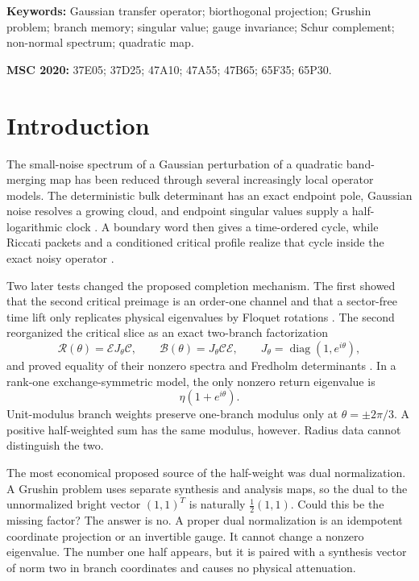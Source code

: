 \documentclass[11pt]{article}
\theoremstyle{definition}
\theoremstyle{remark}
\newcommand{\cR}{\mathcal R}
\newcommand{\cB}{\mathcal B}
\newcommand{\cC}{\mathcal C}
\newcommand{\cE}{\mathcal E}
\begin{document}
\noindent\textbf{Keywords:} Gaussian transfer operator; biorthogonal
projection; Grushin problem; branch memory; singular value; gauge
invariance; Schur complement; non-normal spectrum; quadratic map.

\medskip
\noindent\textbf{MSC 2020:} 37E05; 37D25; 47A10; 47A55; 47B65; 65F35;
65P30.

\section{Introduction}
\label{sec:introduction}

The small-noise spectrum of a Gaussian perturbation of a quadratic
band-merging map has been reduced through several increasingly local
operator models.  The deterministic bulk determinant has an exact endpoint
pole, Gaussian noise resolves a growing cloud, and endpoint singular values
supply a half-logarithmic clock
\citep{WangBulkScattering2026,WangEndpointRank2026}.  A boundary word then
gives a time-ordered cycle, while Riccati packets and a conditioned critical
profile realize that cycle inside the exact noisy operator
\citep{WangTimeOrdered2026,WangGaussianReturn2026}.

Two later tests changed the proposed completion mechanism.  The first showed
that the second critical preimage is an order-one channel and that a
sector-free time lift only replicates physical eigenvalues by Floquet
rotations \citep{WangComplement2026}.  The second reorganized the critical
slice as an exact two-branch factorization
\begin{equation}\label{eq:intro-factorization}
 \cR(\theta)=\cE J_\theta\cC,
 \qquad
 \cB(\theta)=J_\theta\cC\cE,
 \qquad
 J_\theta=\operatorname{diag}(1,e^{i\theta}),
\end{equation}
and proved equality of their nonzero spectra and Fredholm determinants
\citep{WangSectorBranch2026}.  In a rank-one exchange-symmetric model, the
only nonzero return eigenvalue is
\begin{equation}\label{eq:intro-rank-one}
 \eta(1+e^{i\theta}).
\end{equation}
Unit-modulus branch weights preserve one-branch modulus only at
$\theta=\pm2\pi/3$.  A positive half-weighted sum has the same modulus,
however.  Radius data cannot distinguish the two.

The most economical proposed source of the half-weight was dual
normalization.  A Grushin problem uses separate synthesis and analysis maps,
so the dual to the unnormalized bright vector $(1,1)^T$ is naturally
$\frac12(1,1)$.  Could this be the missing factor?  The answer is no.  A
proper dual normalization is an idempotent coordinate projection or an
invertible gauge.  It cannot change a nonzero eigenvalue.  The number one
half appears, but it is paired with a synthesis vector of norm two in branch
coordinates and causes no physical attenuation.
\end{document}
